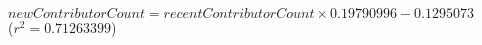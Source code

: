 $\mathit{newContributorCount} = \mathit{recentContributorCount} \times 0.19790996 - 0.1295073$\\($r^2 = 0.71263399$)